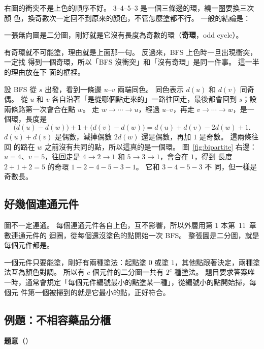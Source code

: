 右圖的衝突不是上色的順序不好。 3--4--5--3 是一個三條邊的環，繞一圈要換三次顏
色，換奇數次一定回不到原來的顏色，不管怎麼塗都不行。 一般的結論是：

\begin{center}
一張無向圖是二分圖，剛好就是它沒有長度為奇數的環（\textbf{奇環}，odd cycle）。
\end{center}

有奇環就不可能塗，理由就是上面那一句。 反過來，BFS 上色時一旦出現衝突，一定找
得到一個奇環，所以「BFS 沒衝突」和「沒有奇環」是同一件事。 這一半的理由放在下
面的框裡。

\begin{whybox}
設 BFS 從 $s$ 出發，看到一條邊 $u$--$v$ 兩端同色。 同色表示 $d(u)$ 和 $d(v)$
同奇偶。 從 $u$ 和 $v$ 各自沿著「是從哪個點走來的」一路往回走，最後都會回到
$s$；設兩條路第一次會合在點 $w$。 走 $w \to \cdots \to u$，經過 $u$--$v$，再走
$v \to \cdots \to w$，是一個環，長度是
\[
\bigl(d(u) - d(w)\bigr) + 1 + \bigl(d(v) - d(w)\bigr)
= d(u) + d(v) - 2d(w) + 1 .
\]
$d(u) + d(v)$ 是偶數，減掉偶數 $2d(w)$ 還是偶數，再加 $1$ 是奇數。 這兩條往回
的路在 $w$ 之前沒有共同的點，所以這真的是一個環。 圖~\ref{fig:bipartite} 右邊：
$u = 4$、$v = 5$，往回走是 $4 \to 2 \to 1$ 和 $5 \to 3 \to 1$，會合在 $1$，得到
長度 $2 + 1 + 2 = 5$ 的奇環 $1 - 2 - 4 - 5 - 3 - 1$。 它和 $3 - 4 - 5 - 3$ 不
同，但一樣是奇數長。
\end{whybox}

\subsection{好幾個連通元件}

圖不一定連通。 每個連通元件各自上色，互不影響，所以外層用第 1 本第~11~章數連通元件的
迴圈，從每個還沒塗色的點開始一次 BFS。 整張圖是二分圖，就是每個元件都是。

一個元件只要能塗，剛好有兩種塗法：起點塗 $0$ 或塗 $1$，其他點跟著決定，兩種塗
法互為顏色對調。 所以有 $c$ 個元件的二分圖一共有 $2^c$ 種塗法。 題目要求答案唯
一時，通常會規定「每個元件編號最小的點塗某一種」，從編號小的點開始掃，每個元
件第一個被掃到的就是它最小的點，正好符合。

\subsection{例題：不相容藥品分櫃}
\label{sec:ex-cabinets}

\textbf{題意}（）

